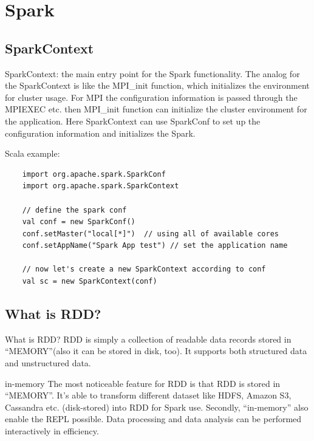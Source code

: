 \documentclass[notheorems, aspectratio=54]{beamer}
\begin{document}
\section{Spark}
\subsection{SparkContext}
\begin{frame}[fragile]
  

   \begin{block}{SparkContext: the main entry point for the Spark functionality.}
   The analog for the SparkContext  is like the MPI\_init function, which initializes the environment for cluster usage. 
   For MPI the configuration information is passed through the MPIEXEC etc. then 
   MPI\_init function can initialize the cluster environment for the application.
   Here SparkContext can use SparkConf
   to set up the configuration information and initializes the Spark.
   \end{block}
   
   Scala example:
   \begin{verbatim}
    import org.apache.spark.SparkConf
    import org.apache.spark.SparkContext

    // define the spark conf
    val conf = new SparkConf()
    conf.setMaster("local[*]")  // using all of available cores 
    conf.setAppName("Spark App test") // set the application name

    // now let's create a new SparkContext according to conf
    val sc = new SparkContext(conf)
   \end{verbatim}     
  
\end{frame}


\subsection{What is RDD?}
\begin{frame}

 \begin{block}{What is RDD?}
  RDD is simply a collection of readable data records stored in ``MEMORY''(also it can be stored in disk, too). 
  It supports both structured data and unstructured data. 
 \end{block}
 
 \begin{block}{in-memory}
   The most noticeable feature for RDD is that RDD is stored in ``MEMORY''. 
 It's able to transform different dataset like HDFS, Amazon S3, Cassandra etc. 
 (disk-stored) into RDD for Spark use. Secondly, ``in-memory'' also enable the 
 REPL possible. Data processing and data analysis can be performed interactively
 in efficiency. 
 \end{block}

\end{frame}
\end{document}
